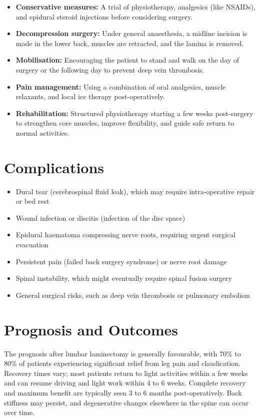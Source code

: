 \begin{itemize}
    \item \textbf{Conservative measures:} A trial of physiotherapy, analgesics (like NSAIDs), and epidural steroid injections before considering surgery.
    \item \textbf{Decompression surgery:} Under general anaesthesia, a midline incision is made in the lower back, muscles are retracted, and the lamina is removed.
    \item \textbf{Mobilisation:} Encouraging the patient to stand and walk on the day of surgery or the following day to prevent deep vein thrombosis.
    \item \textbf{Pain management:} Using a combination of oral analgesics, muscle relaxants, and local ice therapy post-operatively.
    \item \textbf{Rehabilitation:} Structured physiotherapy starting a few weeks post-surgery to strengthen core muscles, improve flexibility, and guide safe return to normal activities.
\end{itemize}

\section*{Complications}
\begin{itemize}
    \item Dural tear (cerebrospinal fluid leak), which may require intra-operative repair or bed rest
    \item Wound infection or discitis (infection of the disc space)
    \item Epidural haematoma compressing nerve roots, requiring urgent surgical evacuation
    \item Persistent pain (failed back surgery syndrome) or nerve root damage
    \item Spinal instability, which might eventually require spinal fusion surgery
    \item General surgical risks, such as deep vein thrombosis or pulmonary embolism
\end{itemize}

\section*{Prognosis and Outcomes}
The prognosis after lumbar laminectomy is generally favourable, with 70\% to 80\% of patients experiencing significant relief from leg pain and claudication. Recovery times vary; most patients return to light activities within a few weeks and can resume driving and light work within 4 to 6 weeks. Complete recovery and maximum benefit are typically seen 3 to 6 months post-operatively. Back stiffness may persist, and degenerative changes elsewhere in the spine can occur over time.

